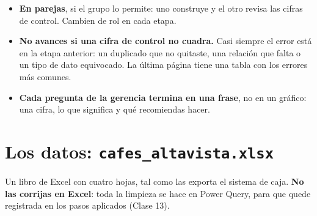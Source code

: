 \documentclass[11pt]{article}
\newcommand{\subtitulo}[1]{\par\needspace{3\baselineskip}\vspace{4pt}{\large\bfseries\color{esumerNavyDark} #1}\par}
\begin{document}
\subtitulo{Cómo trabajar}

\begin{itemize}[itemsep=2pt, topsep=2pt]
  \item \textbf{En parejas}, si el grupo lo permite: uno construye y el otro
    revisa las cifras de control. Cambien de rol en cada etapa.
  \item \textbf{No avances si una cifra de control no cuadra.} Casi siempre
    el error está en la etapa anterior: un duplicado que no quitaste, una
    relación que falta o un tipo de dato equivocado. La última página tiene
    una tabla con los errores más comunes.
  \item \textbf{Cada pregunta de la gerencia termina en una frase}, no en un
    gráfico: una cifra, lo que significa y qué recomiendas hacer.
\end{itemize}

\clearpage
\section*{\color{esumerNavy}Los datos: \texttt{cafes\_altavista.xlsx}}

Un libro de Excel con cuatro hojas, tal como las exporta el sistema de caja.
\textbf{No las corrijas en Excel}: toda la limpieza se hace en Power Query,
para que quede registrada en los pasos aplicados (Clase 13).
\end{document}
